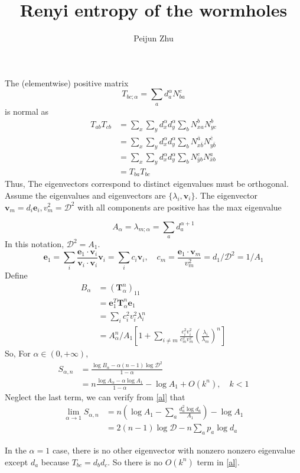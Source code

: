 \documentclass[12pt]{article}
\title{Renyi entropy of the wormholes}
\author{Peijun Zhu}
\begin{document}
\maketitle
The (elementwise) positive matrix
\begin{equation}
T_{bc;\alpha}=\sum_ad_a^\alpha N_{ba}^c
\end{equation}
is normal as
\begin{align}\label{key}
T_{ab}T_{cb}&=\sum_x\sum_y d_x^\alpha d_y^\alpha \sum_b N_{xa}^b N_{yc}^b\\
&=\sum_x\sum_y d_x^\alpha d_y^\alpha \sum_b N_{x\bar b}^{\bar a} N_{y\bar b}^{\bar c}\\
&=\sum_x\sum_y d_x^\alpha d_y^\alpha \sum_b  N_{\bar y b}^{c}N_{\bar xb}^{a}\\
&=T_{ba}T_{bc}
\end{align}
Thus, The eigenvectors correspond to distinct eigenvalues must be orthogonal. Assume the eigenvalues and eigenvectors are $\{\lambda_i, \mathbf v_i\}$. The eigenvector $\mathbf v_m=d_i\mathbf e_i, v_m^2=\mathcal{D}^2$ with all components are positive has the max eigenvalue 

\[A_\alpha=\lambda_{m;\alpha}=\sum_a d_a^{\alpha+1}\]
In this notation, $\mathcal{D}^2=A_1$.
\begin{equation}
\mathbf e_1=\sum_i \frac{\mathbf e_1\cdot \mathbf v_i}{\mathbf v_i\cdot \mathbf v_i}\mathbf{v}_i=\sum_i c_i\mathbf v_i,\quad c_m=\frac{\mathbf e_1\cdot \mathbf v_m}{v_m^2}=d_1/\mathcal{D}^2=1/A_1
\end{equation}
Define
\begin{align}
B_\alpha&=(\mathbf{T}_\alpha^n)_{11}\\
&=\mathbf{e}_1^T\mathbf{T}_\alpha^n \mathbf{e}_1\\
&=\sum_i c_i^2v_i^2\lambda_i^n\\
&=A_\alpha^n/A_1\left[1+\sum_{i\neq m}\frac{c_i^2v_i^2}{c_m^2v_m^2}\left( \frac{\lambda_i}{\lambda_m}\right) ^n\right]
\end{align}
So, For $\alpha\in (0,+\infty)$, 
\begin{align}
S_{\alpha, n}&=\frac{\log B_\alpha-\alpha(n-1)\log \mathcal{D}^2}{1-\alpha}\\
&=n\frac{\log A_\alpha-\alpha\log A_1}{1-\alpha}-\log A_1+O(k^n),\quad k<1\label{al}
\end{align}
Neglect the last term, we can verify from \ref{al} that 
\begin{align}
\lim_{\alpha\to 1}S_{\alpha, n}&=n\left(\log A_1-\sum_a\frac{d_a^2\log d_a}{A_1} \right) -\log A_1\\
&=2(n-1)\log \mathcal{D}-n\sum_a p_a\log d_a
\end{align}

In the $\alpha=1$ case, there is no other eigenvector with nonzero nonzero eigenvalue except $d_a$ because $T_{bc}=d_bd_c$. So there is no $O(k^n)$ term in \ref{al}.
\end{document}
